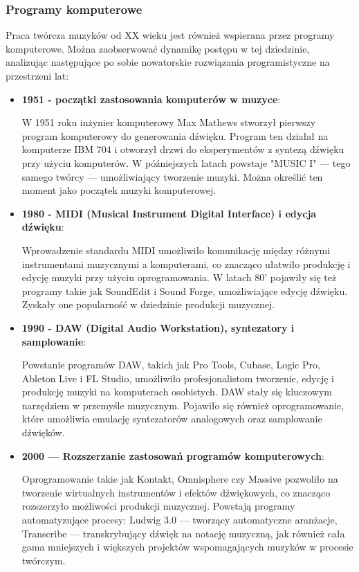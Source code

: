 \subsubsection{Programy komputerowe}
Praca twórcza muzyków od XX wieku jest również wspierana przez programy komputerowe. Można zaobserwować dynamikę postępu
w tej dziedzinie, analizując następujące po sobie nowatorskie rozwiązania programistyczne na przestrzeni lat:
\begin{itemize}
	\item \textbf{1951 - początki zastosowania komputerów w muzyce}:

	      W 1951 roku inżynier komputerowy Max Mathews stworzył pierwszy program komputerowy do generowania dźwięku.
	      Program ten działał na komputerze IBM 704 i otworzył drzwi do eksperymentów z syntezą dźwięku przy użyciu komputerów.
	      W późniejszych latach powstaje "MUSIC I" — tego samego twórcy — umożliwiający tworzenie muzyki.
	      Można określić ten moment jako początek muzyki komputerowej.
	\item \textbf{1980 - MIDI (Musical Instrument Digital Interface) i edycja dźwięku}:

	      Wprowadzenie standardu MIDI umożliwiło komunikację między różnymi instrumentami muzycznymi a komputerami,
	      co znacząco ułatwiło produkcję i edycję muzyki przy użyciu oprogramowania.
	      W latach 80' pojawiły się też programy takie jak SoundEdit i Sound Forge, umożliwiające edycję dźwięku.
	      Zyskały one popularność w dziedzinie produkcji muzycznej.
	\item \textbf{1990 - DAW (Digital Audio Workstation), syntezatory i samplowanie}:

	      Powstanie programów DAW, takich jak Pro Tools, Cubase, Logic Pro, Ableton Live i FL Studio,
	      umożliwiło profesjonalistom tworzenie, edycję i produkcję muzyki na komputerach osobistych.
	      DAW stały się kluczowym narzędziem w przemyśle muzycznym.
	      Pojawiło się również oprogramowanie, które umożliwia emulację syntezatorów analogowych oraz samplowanie dźwięków.
	\item \textbf{2000 — Rozszerzanie zastosowań programów komputerowych}:

	      Oprogramowanie takie jak Kontakt, Omnisphere czy Massive pozwoliło na tworzenie wirtualnych instrumentów i efektów
	      dźwiękowych, co znacząco rozszerzyło możliwości produkcji muzycznej.
	      Powstają programy automatyzujące procesy: Ludwig 3.0 — tworzący automatyczne aranżacje, Transcribe — transkrybujący
	      dźwięk na notację muzyczną, jak również cała gama mniejszych i większych projektów wspomagających muzyków w procesie
	      twórczym.
\end{itemize}

